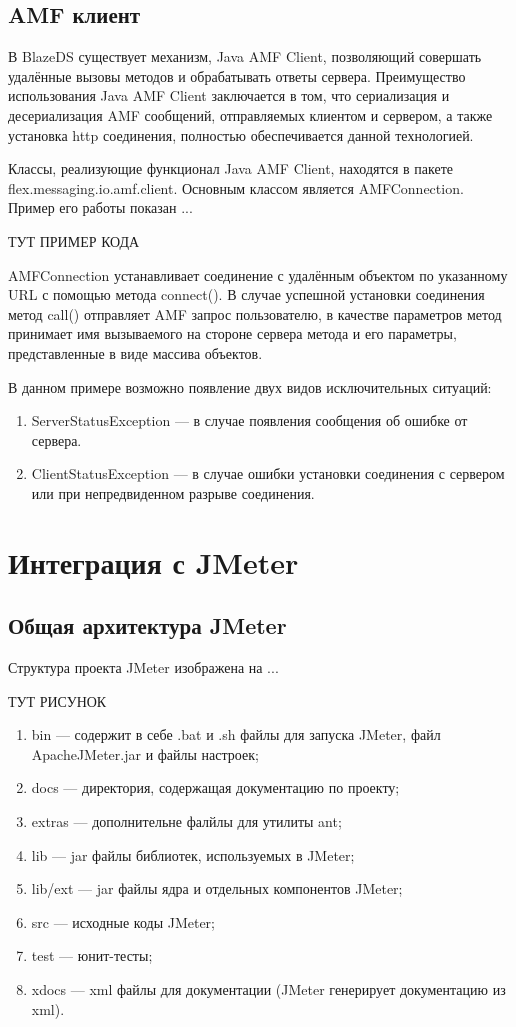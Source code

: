 \subsection{AMF клиент}

В BlazeDS существует механизм, Java AMF Client, позволяющий совершать удалённые вызовы методов и обрабатывать ответы
сервера. Преимущество использования Java AMF Client заключается в том, что сериализация и десериализация AMF сообщений,
отправляемых клиентом и сервером, а также установка http соединения, полностью обеспечивается данной технологией.

Классы, реализующие функционал Java AMF Client, находятся в пакете flex.messaging.io.amf.client. Основным классом
является AMFConnection. Пример его работы показан ...

 ТУТ ПРИМЕР КОДА

AMFConnection устанавливает соединение с удалённым объектом по указанному URL с помощью метода connect().
В случае успешной установки соединения метод call() отправляет AMF запрос пользователю, в качестве параметров метод
принимает имя вызываемого на стороне сервера метода и его параметры, представленные в виде массива объектов.

В данном примере возможно появление двух видов исключительных ситуаций:

\begin{enumerate}
\item ServerStatusException --- в случае появления сообщения об ошибке от сервера.
\item ClientStatusException --- в случае ошибки установки соединения с сервером или при непредвиденном разрыве
соединения.
\end{enumerate}

\section{Интеграция с JMeter}

\subsection{Общая архитектура JMeter}

Структура проекта JMeter изображена на ...

ТУТ РИСУНОК

\begin{enumerate}
\item bin --- содержит в себе .bat и .sh файлы для запуска JMeter, файл ApacheJMeter.jar и файлы настроек;
\item docs --- директория, содержащая документацию по проекту;
\item extras --- дополнительне фалйлы для утилиты ant;
\item lib --- jar файлы библиотек, используемых в JMeter;
\item lib/ext --- jar файлы ядра и отдельных компонентов JMeter;
\item src --- исходные коды JMeter;
\item test --- юнит-тесты;
\item xdocs --- xml файлы для документации (JMeter генерирует документацию из xml).
\end{enumerate}

